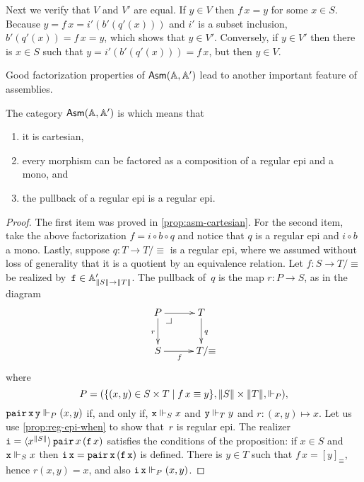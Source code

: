 Next we verify that $V$ and $V'$ are equal. If $y \in V$ then $f\,x =
y$ for some $x \in S$. Because $y = f\,x = i'(b'(q'(x)))$ and $i'$ is
a subset inclusion, $b'(q'(x)) = f\,x = y$, which shows that $y \in
V'$. Conversely, if $y \in V'$ then there is $x \in S$ such that $y =
i'(b'(q'(x))) = f\,x$, but then $y \in V$.

Good factorization properties of $\AsmA$ lead to another important
feature of assemblies.

\begin{proposition}
  \label{prop:asm-regular}%
  The category $\AsmA$ is  which means that
  \begin{enumerate}
  \item it is cartesian,
  \item every morphism can be factored as a composition of a regular
    epi and a mono, and
  \item the pullback of a regular epi is a regular epi.
  \end{enumerate}
\end{proposition}

\begin{proof}
  The first item was proved in \cref{prop:asm-cartesian}.
  For the second item, take the above factorization $f = i \circ b
  \circ q$ and notice that $q$ is a regular epi and $i \circ b$ a
  mono. Lastly, suppose $q : T \to T/{\equiv}$ is a
  regular epi, where we assumed without loss of generality that it is
  a quotient by an equivalence relation. Let $f : S \to
  T/{\equiv}$ be realized by~$\R{f} \in \subAtyp{\T{S} \to \T{T}}$.
  The pullback of~$q$ is the map $r : P \to S$, as in the
  diagram
  \begin{equation*}
    \xymatrix{
      {P} \pbcorner
      \ar[r]
      \ar[d]_{r}
      &
      {T}
      \ar[d]^{q}
      \\
      {S}
      \ar[r]_{f}
      &
      **[r]{T/{\equiv}}
      }
  \end{equation*}
  where
  \begin{equation*}
    P = (\set{(x,y) \in S \times T \such f\,x \equiv y},
               \T{S} \times \T{T}, {\rz[P]}),
  \end{equation*}
  $\combPair\,\R{x}\,\R{y} \rz[P] (x,y)$ if, and only if, $\R{x} \rz[S]
  x$ and $\R{y} \rz[T] y$ and $r : (x,y) \mapsto x$. Let us use
  \cref{prop:reg-epi-when} to show that~$r$ is regular epi.
  The realizer $\R{i} =
  \tpcalam{x}{\T{S}}{\combPair\,x\,(\R{f}\,x)}$ satisfies the
  conditions of the proposition: if $x \in S$ and $\R{x} \rz[S] x$ then
  $\R{i}\,\R{x} = \combPair\,\R{x}\,(\R{f}\,\R{x})$ is defined. There
  is $y \in T$ such that $f\,x = [y]_{\equiv}$, hence $r (x, y) = x$,
  and also $\R{i}\,\R{x} \rz[P] (x, y)$.
\end{proof}


